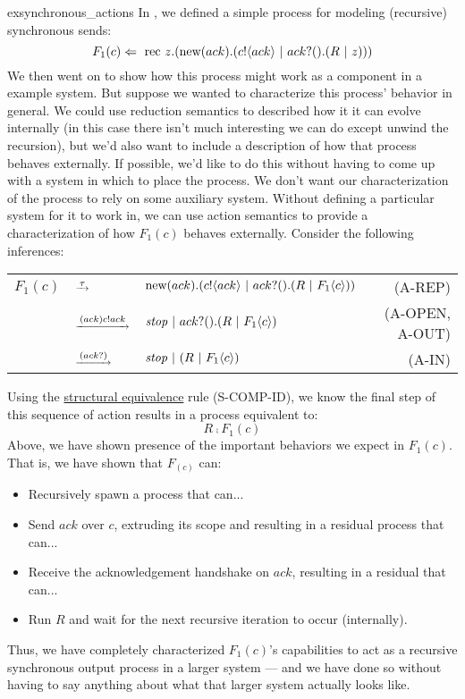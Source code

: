 \begin{example}{exsynchronous_actions}
	In , we defined a simple process for modeling (recursive) synchronous sends:
\[
	F_1(c) \Leftarrow\  \text{rec }{z}. (\text{new}({ack}).({c}!\langle{ack}\rangle \ |\  {ack}?({}).(R \ |\  z)))\\
\]
We then went on to show how this process might work as a component in a example system.  
But suppose we wanted to characterize this process' behavior in general.  
We could use reduction semantics to described how it it can evolve internally (in this case there isn't much interesting we can do except unwind the recursion), but we'd also want to include a description of how that process behaves externally.  
If possible, we'd like to do this without having to come up with a system in which to place the process.  
We don't want our characterization of the process to rely on some auxiliary system.  
Without defining a particular system for it to work in, we can use action semantics to provide a characterization of how $F_1(c)$ behaves externally.  
Consider the following inferences:
\begin{center}\begin{tabular}{lllr}
	$F_1(c)$ & $\overset{\underrightarrow{\ {\tau}\ }}{}$ & $\text{new}({ack}).({c}!\langle{ack}\rangle \ |\  {ack}?({}).(R \ |\  F_1\langle c\rangle))$ & \tiny{(A-REP)}\\
	& $\overset{\underrightarrow{\ { \ensuremath{({ack})}  \ensuremath{{c}!{ack}} }\ }}{}$ & $\mbox{\emph{stop}} \ |\  {ack}?({}).(R \ |\  F_1\langle c\rangle)$ & \tiny{(A-OPEN, A-OUT)}\\
	& $\overset{\underrightarrow{\ { \ensuremath{({{ack}?{}})} }\ }}{}$ & $\mbox{\emph{stop}} \ |\  (R \ |\  F_1\langle c\rangle)$& \tiny{(A-IN)}\\
\end{tabular}\end{center}
Using the \hyperref[Structural Equivalence]{structural equivalence} rule (S-COMP-ID),  
we know the final step of this sequence of action results in a process equivalent to:
\[
	R \comp F_1(c)
\]
Above, we have shown presence of the important behaviors we expect in $F_1(c)$.  
That is, we have shown that $F_(c)$ can:
\begin{itemize}
\item Recursively spawn a process that can...
\item Send $ack$ over $c$, extruding its scope and resulting in a residual process that can...
\item Receive the acknowledgement handshake on $ack$, resulting in a residual that can... 
\item Run $R$ and wait for the next recursive iteration to occur (internally).
\end{itemize}
Thus, we have completely characterized $F_1(c)$'s capabilities to act as a recursive synchronous output process in a larger system --- and we have done so without having to say anything about what that larger system actually looks like. 
\end{example}

